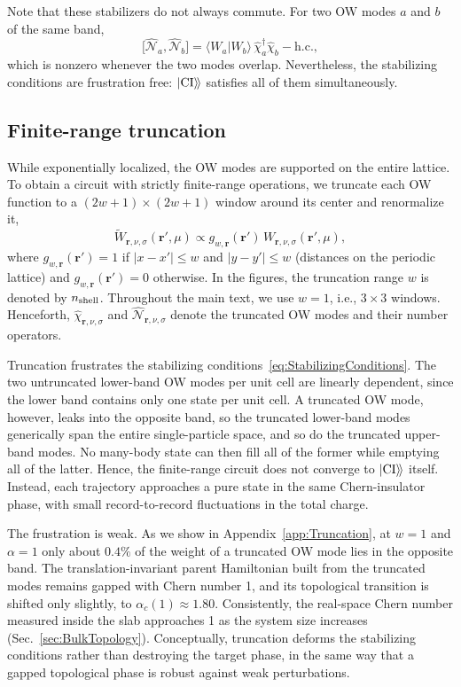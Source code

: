 \documentclass[aps,prb,10pt,twocolumn,superscriptaddress,longbibliography,floatfix]{revtex4-2}
\newcommand{\mc}[1]{\mathcal{#1}}
\newcommand{\mr}[1]{\mathrm{#1}}
\newcommand{\bfr}{\boldsymbol r}
\newcommand{\kett}[1]{\ket{#1}\!\rangle}
\newcommand{\CI}{\kett{\mr{CI}}}
\newcommand{\newtext}[1]{{\color{blue}#1}}
\begin{document}
Note that these stabilizers do not always commute. For two OW modes $a$ and $b$ of the same band,
\begin{equation}
    \big[\hat{\mc N}_a,\hat{\mc N}_b\big]=\langle W_a|W_b\rangle\,\hat\chi^\dagger_a\hat\chi_b-\mr{h.c.},
    \label{eq:StabilizerCommutator}
\end{equation}
which is nonzero whenever the two modes overlap. Nevertheless, the stabilizing conditions are frustration free: $\CI$ satisfies all of them simultaneously.

\subsection{Finite-range truncation}
\label{sec:TruncatedOW}

While exponentially localized, the OW modes are supported on the entire lattice. To obtain a circuit with strictly finite-range operations, we truncate each OW function to a $(2w+1)\times(2w+1)$ window around its center and renormalize it,
\begin{equation}
    \widetilde W_{\bfr,\nu,\sigma}(\bfr',\mu)\propto g_{w,\bfr}(\bfr')\,W_{\bfr,\nu,\sigma}(\bfr',\mu),
    \label{eq:TruncatedOW}
\end{equation}
where $g_{w,\bfr}(\bfr')=1$ if $|x-x'|\leq w$ and $|y-y'|\leq w$ (distances on the periodic lattice) and $g_{w,\bfr}(\bfr')=0$ otherwise. In the figures, the truncation range $w$ is denoted by $n_{\rm shell}$. Throughout the main text, we use $w=1$, i.e., $3\times3$ windows. Henceforth, $\hat\chi_{\bfr,\nu,\sigma}$ and $\hat{\mc N}_{\bfr,\nu,\sigma}$ denote the truncated OW modes and their number operators.

Truncation frustrates the stabilizing conditions~\eqref{eq:StabilizingConditions}. The two untruncated lower-band OW modes per unit cell are linearly dependent, since the lower band contains only one state per unit cell. A truncated OW mode, however, leaks into the opposite band, so the truncated lower-band modes generically span the entire single-particle space, and so do the truncated upper-band modes. No many-body state can then fill all of the former while emptying all of the latter. Hence, the finite-range circuit does not converge to $\CI$ itself. Instead, each trajectory approaches a pure state in the same Chern-insulator phase, with small record-to-record fluctuations in the total charge.

The frustration is weak. As we show in Appendix~\ref{app:Truncation}, at $w=1$ and $\alpha=1$ only about $0.4\%$ of the weight of a truncated OW mode lies in the opposite band. The translation-invariant parent Hamiltonian built from the truncated modes remains gapped with Chern number 1, and its topological transition is shifted only slightly, to $\alpha_c(1)\approx1.80$. \newtext{Consistently, the real-space Chern number measured inside the slab approaches 1 as the system size increases (Sec.~\ref{sec:BulkTopology}).} Conceptually, truncation deforms the stabilizing conditions rather than destroying the target phase, in the same way that a gapped topological phase is robust against weak perturbations.
\end{document}

